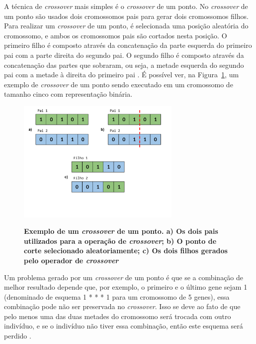 \documentclass[12pt,oneside,a4paper,english,french,spanish,brazil,]{abntex2}
\begin{document}
A técnica de \textit{crossover} mais simples é o \textit{crossover} de um ponto. No \textit{crossover} de um ponto são usados dois cromossomos pais para gerar dois cromossomos filhos. Para realizar um \textit{crossover} de um ponto, é selecionada uma posição aleatória do cromossomo, e ambos os cromossomos pais são cortados nesta posição. O primeiro filho é composto através da concatenação da parte esquerda do primeiro pai com a parte direita do segundo pai. O segundo filho é composto através da concatenação das partes que sobraram, ou seja, a metade esquerda do segundo pai com a metade à direita do primeiro pai \cite{linden:2008}. É possível ver, na Figura~\ref{fig:GA_Crossover_de_um_ponto}, um exemplo de \textit{crossover}  de um ponto sendo executado em um cromossomo de tamanho cinco com representação binária.

\begin{figure}[ht]
\centering
\caption{\textbf{Exemplo de um \textit{crossover} de um ponto. a) Os dois pais utilizados para a operação de \textit{crossover}; b) O ponto de corte selecionado aleatoriamente; c) Os dois filhos gerados pelo operador de \textit{crossover}}}
\includegraphics[width=0.7\textwidth]{imagens/GA_Crossover_de_um_ponto.pdf}
\label{fig:GA_Crossover_de_um_ponto}
\end{figure}

Um problema gerado por um \textit{crossover} de um ponto é que se a combinação de melhor resultado depende que, por exemplo, o primeiro e o último gene sejam 1 (denominado de esquema 1 * * * 1 para um cromossomo de 5 genes), essa combinação pode não ser preservada no \textit{crossover}. Isso se deve ao fato de que pelo menos uma das duas metades do cromossomo será trocada com outro indivíduo, e se o indivíduo não tiver essa combinação, então este esquema será perdido \cite{linden:2008}.
\end{document}
